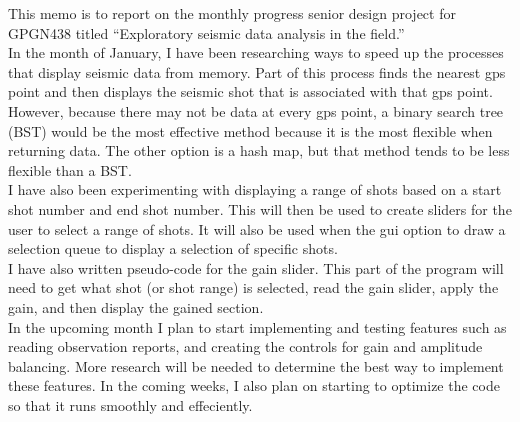 \documentclass[a4paper,12pt]{texMemo}
\begin{document}
\maketitle

This memo is to report on the monthly progress senior design project for GPGN438 titled ``Exploratory seismic data analysis in the field.'' \\

In the month of January, I have been researching ways to speed up the processes that display seismic data from memory. Part of this process finds the nearest gps point and then displays the seismic shot that is associated with that gps point. However, because there may not be data at every gps point, a binary search tree (BST) would be the most effective method because it is the most flexible when returning data. The other option is a hash map, but that method tends to be less flexible than a BST. \\

I have also been experimenting with displaying a range of shots based on a start shot number and end shot number. This will then be used to create sliders for the user to select a range of shots. It will also be used when the gui option to draw a selection queue to display a selection of specific shots. \\

I have also written pseudo-code for the gain slider. This part of the program will need to get what shot (or shot range) is selected, read the gain slider, apply the gain, and then display the gained section. \\

In the upcoming month I plan to start implementing and testing features such as reading observation reports, and creating the controls for gain and amplitude balancing. More research will be needed to determine the best way to implement these features. In the coming weeks, I also plan on starting to optimize the code so that it runs smoothly and effeciently.\\
\end{document}
